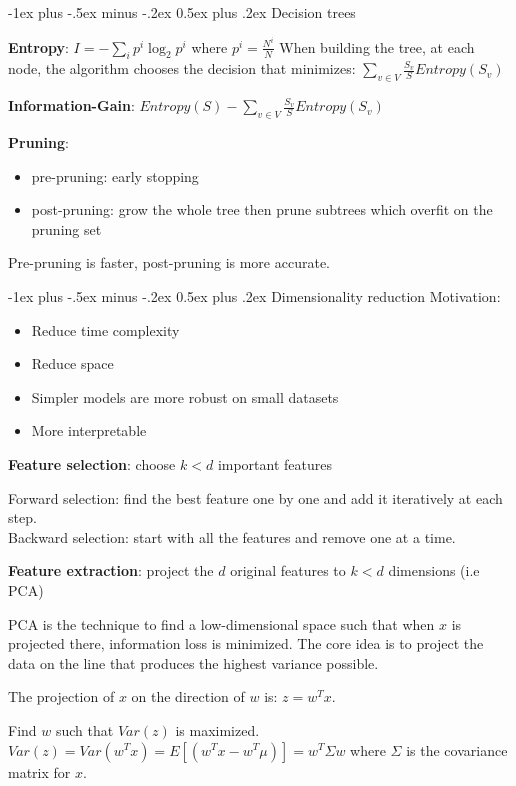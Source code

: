 \documentclass[10pt,letterpaper]{article}
\makeatletter
\renewcommand{\section}{\@startsection{section}{1}{0mm}%
                                {-1ex plus -.5ex minus -.2ex}%
                                {0.5ex plus .2ex}%
                                {\normalfont\large\bfseries}}
\makeatother
\begin{document}
\begin{multicols}{3}
\section{Decision trees}

\textbf{Entropy}: $I = - \sum_i p^{i} \log_2 p^{i}$ where $p^i = \frac{N^i}{N}$
When building the tree, at each node, the algorithm chooses the decision that minimizes: $\sum_{v \in V} \frac{S_v}{S} Entropy(S_v)$

\textbf{Information-Gain}: $Entropy(S) - \sum_{v \in V} \frac{S_v}{S} Entropy(S_v)$

\textbf{Pruning}: 
\begin{itemize}
	\item pre-pruning: early stopping
	\item post-pruning: grow the whole tree then prune subtrees which overfit on the pruning set
\end{itemize}

Pre-pruning is faster, post-pruning is more accurate.


\section{Dimensionality reduction}
Motivation:
\begin{itemize}
	\item Reduce time complexity
	\item Reduce space
	\item Simpler models are more robust on small datasets
	\item More interpretable
\end{itemize}

\textbf{Feature selection}: choose $k<d$ important features

Forward selection: find the best feature one by one and add it iteratively at each step. \\
Backward selection: start with all the features and remove one at a time.

\textbf{Feature extraction}: project the $d$ original features to $k<d$ dimensions (i.e PCA)

PCA is the technique to find a low-dimensional space such that when $x$ is projected there, information loss is minimized.
The core idea is to project the data on the line that produces the highest variance possible.

The projection of $x$ on the direction of $w$ is: $z = w^T x$.

Find $w$ such that $Var(z)$ is maximized.
$Var(z) = Var(w^T x) = E[ (w^Tx -w^T\mu )] = w^T \Sigma w$ where $\Sigma$ is the covariance matrix for $x$.


\end{multicols}
\end{document}

